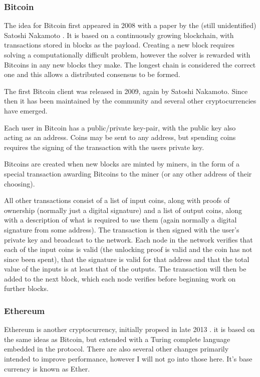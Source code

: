 \documentclass[10pt,twoside,a4paper]{article}
\begin{document}
\subsubsection{Bitcoin}

The idea for Bitcoin first appeared in 2008 with a paper by the (still unidentified) Satoshi Nakamoto \cite{bitcoin-whitepaper}.
It is based on a continuously growing blockchain, with transactions stored in blocks as the payload.
Creating a new block requires solving a computationally difficult problem, however the solver is rewarded with Bitcoins
in any new blocks they make.
The longest chain is considered the correct one and this allows a distributed consensus to be formed.

The first Bitcoin client was released in 2009, again by Satoshi Nakamoto.
Since then it has been maintained by the community and several other cryptocurrencies have emerged.


Each user in Bitcoin has a public/private key-pair, with the public key also acting as an address.
Coins may be sent to any address, but spending coins requires the signing of the transaction with the users private key.

Bitcoins are created when new blocks are minted by miners,
in the form of a special transaction awarding Bitcoins to the miner (or any other address of their choosing).

All other transactions consist of a list of input coins, along with proofs of ownership (normally just a digital signature)
and a list of output coins, along with a description of what is required to use them (again normally a digital signature from some address).
The transaction is then signed with the user's private key and broadcast to the network.
Each node in the network verifies that each of the input coins is valid (the unlocking proof is valid
and the coin has not since been spent), that the signature is valid for that address and that the total value of the inputs is at least that of the outputs.
The transaction will then be added to the next block, which each node verifies before beginning work on further blocks.


\subsubsection{Ethereum}


Ethereum is another cryptocurrency, initially propsed in late 2013 \cite{eth-whitepaper}.
it is based on the same ideas as Bitcoin, but extended with a Turing complete language
embedded in the protocol.
There are also several other changes primarily intended to improve performance, however I will not go into those here.
It's base currency is known as Ether.
\end{document}
